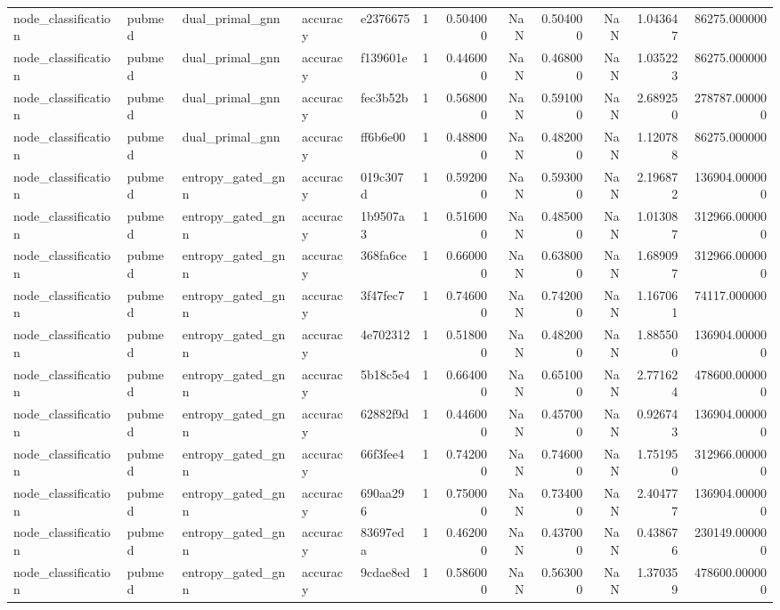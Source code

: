 \begin{tabular}{lllllrrrrrrr}
node_classification & pubmed & dual_primal_gnn & accuracy & e2376675 & 1 & 0.504000 & NaN & 0.504000 & NaN & 1.043647 & 86275.000000 \\
node_classification & pubmed & dual_primal_gnn & accuracy & f139601e & 1 & 0.446000 & NaN & 0.468000 & NaN & 1.035223 & 86275.000000 \\
node_classification & pubmed & dual_primal_gnn & accuracy & fec3b52b & 1 & 0.568000 & NaN & 0.591000 & NaN & 2.689250 & 278787.000000 \\
node_classification & pubmed & dual_primal_gnn & accuracy & ff6b6e00 & 1 & 0.488000 & NaN & 0.482000 & NaN & 1.120788 & 86275.000000 \\
node_classification & pubmed & entropy_gated_gnn & accuracy & 019c307d & 1 & 0.592000 & NaN & 0.593000 & NaN & 2.196872 & 136904.000000 \\
node_classification & pubmed & entropy_gated_gnn & accuracy & 1b9507a3 & 1 & 0.516000 & NaN & 0.485000 & NaN & 1.013087 & 312966.000000 \\
node_classification & pubmed & entropy_gated_gnn & accuracy & 368fa6ce & 1 & 0.660000 & NaN & 0.638000 & NaN & 1.689097 & 312966.000000 \\
node_classification & pubmed & entropy_gated_gnn & accuracy & 3f47fec7 & 1 & 0.746000 & NaN & 0.742000 & NaN & 1.167061 & 74117.000000 \\
node_classification & pubmed & entropy_gated_gnn & accuracy & 4e702312 & 1 & 0.518000 & NaN & 0.482000 & NaN & 1.885500 & 136904.000000 \\
node_classification & pubmed & entropy_gated_gnn & accuracy & 5b18c5e4 & 1 & 0.664000 & NaN & 0.651000 & NaN & 2.771624 & 478600.000000 \\
node_classification & pubmed & entropy_gated_gnn & accuracy & 62882f9d & 1 & 0.446000 & NaN & 0.457000 & NaN & 0.926743 & 136904.000000 \\
node_classification & pubmed & entropy_gated_gnn & accuracy & 66f3fee4 & 1 & 0.742000 & NaN & 0.746000 & NaN & 1.751950 & 312966.000000 \\
node_classification & pubmed & entropy_gated_gnn & accuracy & 690aa296 & 1 & 0.750000 & NaN & 0.734000 & NaN & 2.404777 & 136904.000000 \\
node_classification & pubmed & entropy_gated_gnn & accuracy & 83697eda & 1 & 0.462000 & NaN & 0.437000 & NaN & 0.438676 & 230149.000000 \\
node_classification & pubmed & entropy_gated_gnn & accuracy & 9cdae8ed & 1 & 0.586000 & NaN & 0.563000 & NaN & 1.370359 & 478600.000000 \\

\end{tabular}
